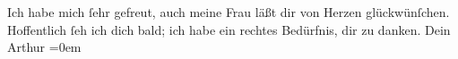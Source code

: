 \begin{ledgroupsized}[t]{13cm}
           \pstart
           Ich habe mich ſehr gefreut, auch meine Frau läßt dir von Herzen glückwünſchen.\pend
           \pstart
           Hoffentlich ſeh ich dich bald; ich habe ein rechtes Bedürfnis, dir zu danken.\pend
           \pstart
           Dein{\\[\baselineskip]}\spacefill\mbox{Arthur}\pend
           \leftskip=0em{}
         
         \endnumbering{}\end{ledgroupsized}  \newcommand{\dateiname}{L01523}\newcommand{\titel}{Arthur Schnitzler an Hermann Bahr, 6. 6. 1905}\newcommand{\editorInnen}{ Kurt Ifkovits,  Martin Anton Müller}
      